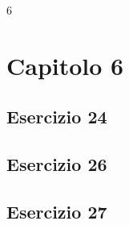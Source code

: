 6\section{\textbf{Capitolo 6}}
\subsection{Esercizio 24}

\subsection{Esercizio 26}

\subsection{Esercizio 27}

